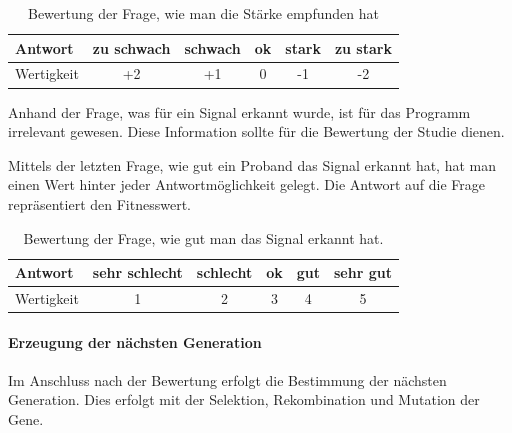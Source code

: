 \begin{table}[]
\centering
\caption{Bewertung der Frage, wie man die St{\"a}rke empfunden hat}
\label{bewertungzdiagrammfrage}
\begin{tabular}{l|l|l|l|l|l}
Antwort    & zu schwach              & schwach                 & ok                     & stark                   & zu stark               \\ \hline
Wertigkeit & \multicolumn{1}{c|}{+2} & \multicolumn{1}{c|}{+1} & \multicolumn{1}{c|}{0} & \multicolumn{1}{c|}{-1} & \multicolumn{1}{c}{-2}
\end{tabular}
\end{table}

Anhand der Frage, was f{\"u}r ein Signal erkannt wurde, ist f{\"u}r das Programm irrelevant gewesen. Diese Information sollte f{\"u}r die Bewertung der Studie dienen.

Mittels der letzten Frage, wie gut ein Proband das Signal erkannt hat, hat man einen Wert hinter jeder Antwortm{\"o}glichkeit gelegt. Die Antwort auf die Frage repr{\"a}sentiert den Fitnesswert. 

\begin{table}[]
\centering
\caption{Bewertung der Frage, wie gut man das Signal erkannt hat.}
\label{signalRating}
\begin{tabular}{l|l|l|l|l|l}
Antwort   & sehr schlecht          & schlecht               & ok                    & gut                   & sehr gut              \\ \hline
Wertigkeit & \multicolumn{1}{c|}{1} & \multicolumn{1}{c|}{2} & \multicolumn{1}{c|}{3} & \multicolumn{1}{c|}{4} & \multicolumn{1}{c}{5}
\end{tabular}
\end{table}

\paragraph{Erzeugung der n{\"a}chsten Generation}
Im Anschluss nach der Bewertung erfolgt die Bestimmung der n{\"a}chsten Generation. Dies erfolgt mit der Selektion, Rekombination und Mutation der Gene. 

